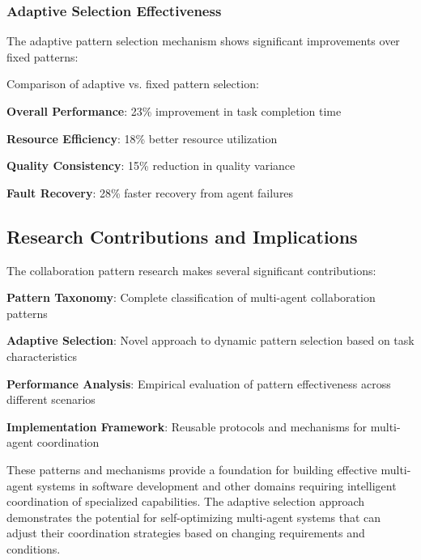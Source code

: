 \subsubsection*{Adaptive Selection Effectiveness}

The adaptive pattern selection mechanism shows significant improvements over fixed patterns:

\begin{infobox}[title=Adaptive Selection Benefits]
Comparison of adaptive vs. fixed pattern selection:
\begin{compactlist}
    \item \textbf{Overall Performance}: 23\% improvement in task completion time
    \item \textbf{Resource Efficiency}: 18\% better resource utilization
    \item \textbf{Quality Consistency}: 15\% reduction in quality variance
    \item \textbf{Fault Recovery}: 28\% faster recovery from agent failures
\end{compactlist}
\end{infobox}

\subsection*{Research Contributions and Implications}

The collaboration pattern research makes several significant contributions:

\begin{expandedlist}
    \item \textbf{Pattern Taxonomy}: Complete classification of multi-agent collaboration patterns
    \item \textbf{Adaptive Selection}: Novel approach to dynamic pattern selection based on task characteristics
    \item \textbf{Performance Analysis}: Empirical evaluation of pattern effectiveness across different scenarios
    \item \textbf{Implementation Framework}: Reusable protocols and mechanisms for multi-agent coordination
\end{expandedlist}

These patterns and mechanisms provide a foundation for building effective multi-agent systems in software development and other domains requiring intelligent coordination of specialized capabilities. The adaptive selection approach demonstrates the potential for self-optimizing multi-agent systems that can adjust their coordination strategies based on changing requirements and conditions.
